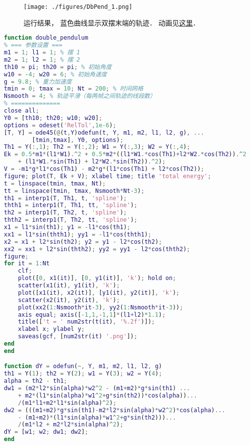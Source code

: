 
\begin{issues}
\issueDraft
\end{issues}


\begin{figure}[ht]
\centering
\texttt{[image: ./figures/DbPend\_1.png]}
\caption{运行结果， 蓝色曲线显示双摆末端的轨迹． 动画见\href{https://wuli.wiki/apps/DbPend.html}{这里}．} \label{DbPend_fig1}
\end{figure}

\begin{lstlisting}[language=matlab]
% 双摆运动
function double_pendulum
% === 参数设置 ===
m1 = 1; l1 = 1; % 摆 1
m2 = 1; l2 = 1; % 摆 2
th10 = pi; th20 = pi; % 初始角度
w10 = -4; w20 = 6; % 初始角速度
g = 9.8; % 重力加速度
tmin = 0; tmax = 10; Nt = 200; % 时间网格
Nsmooth = 4; % 轨迹平滑（每两帧之间轨迹的线段数）
% ==============
close all;
Y0 = [th10; th20; w10; w20];
options = odeset('RelTol',1e-6);
[T, Y] = ode45(@(t,Y)odefun(t, Y, m1, m2, l1, l2, g), ...
        [tmin,tmax], Y0, options);
Th1 = Y(:,1); Th2 = Y(:,2); W1 = Y(:,3); W2 = Y(:,4);
Ek = 0.5*m1*(l1*W1).^2 + 0.5*m2*((l1*W1.*cos(Th1)+l2*W2.*cos(Th2)).^2 ...
    + (l1*W1.*sin(Th1) + l2*W2.*sin(Th2)).^2);
V = -m1*g*l1*cos(Th1) - m2*g*(l1*cos(Th1) + l2*cos(Th2));
figure; plot(T, Ek + V); xlabel time; title 'total energy';
t = linspace(tmin, tmax, Nt);
tt = linspace(tmin, tmax, Nsmooth*Nt-3);
th1 = interp1(T, Th1, t, 'spline');
thth1 = interp1(T, Th1, tt, 'spline');
th2 = interp1(T, Th2, t, 'spline');
thth2 = interp1(T, Th2, tt, 'spline');
x1 = l1*sin(th1); y1 = -l1*cos(th1);
xx1 = l1*sin(thth1); yy1 = -l1*cos(thth1);
x2 = x1 + l2*sin(th2); y2 = y1 - l2*cos(th2);
xx2 = xx1 + l2*sin(thth2); yy2 = yy1 - l2*cos(thth2);
figure;
for it = 1:Nt
    clf;
    plot([0, x1(it)], [0, y1(it)], 'k'); hold on;
    scatter(x1(it), y1(it), 'k');
    plot([x1(it), x2(it)], [y1(it), y2(it)], 'k');
    scatter(x2(it), y2(it), 'k');
    plot(xx2(1:Nsmooth*it-3), yy2(1:Nsmooth*it-3));
    axis equal; axis([-1,1,-1,1]*(l1+l2)*1.1);
    title(['t = ' num2str(t(it), '%.2f')]);
    xlabel x; ylabel y;
    saveas(gcf, [num2str(it) '.png']);
end
end

function dY = odefun(~, Y, m1, m2, l1, l2, g)
th1 = Y(1); th2 = Y(2); w1 = Y(3); w2 = Y(4);
alpha = th2 - th1;
dw1 = (m2*l2*sin(alpha)*w2^2 - (m1+m2)*g*sin(th1) ...
    + m2*(l1*sin(alpha)*w1^2+g*sin(th2))*cos(alpha))...
    /(m1*l1+m2*l1*sin(alpha)^2);
dw2 = (((m1+m2)*g*sin(th1)-m2*l2*sin(alpha)*w2^2)*cos(alpha)...
    - (m1+m2)*(l1*sin(alpha)*w1^2+g*sin(th2)))...
    /(m1*l2 + m2*l2*sin(alpha)^2);
dY = [w1; w2; dw1; dw2];
end
\end{lstlisting}
